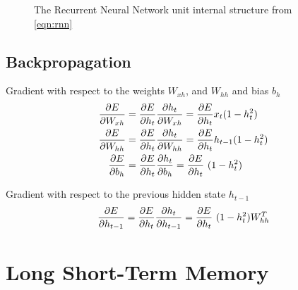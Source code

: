 \begin{figure}[htbp]
    \centering
    \caption{The Recurrent Neural Network unit internal structure from \autoref{eqn:rnn}}
    \label{fig:rnn_unit}
\end{figure}

\subsection{Backpropagation}

Gradient with respect to the weights $W_{xh}$, and $W_{hh}$ and bias $b_h$
\begin{align}
    \pdv{E}{W_{xh}} &= \pdv{E}{h_t}\pdv{h_t}{W_{xh}} = \pdv{E}{h_t} x_t (1-h_t^2) \\
    \pdv{E}{W_{hh}} &= \pdv{E}{h_t}\pdv{h_t}{W_{hh}} = \pdv{E}{h_t} h_{t-1} (1-h_t^2) \\
    \pdv{E}{b_h} &= \pdv{E}{h_t}\pdv{h_t}{b_h} = \pdv{E}{h_t}~(1-h_t^2) \\
\end{align}

Gradient with respect to the previous hidden state $h_{t-1}$
\begin{equation}
    \pdv{E}{h_{t-1}} = \pdv{E}{h_t} \pdv{h_t}{h_{t-1}} = \pdv{E}{h_t}~(1-h_t^2) W_{hh}^T
\end{equation}

\section{Long Short-Term Memory}

